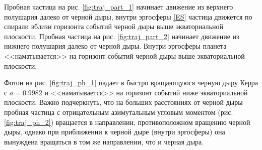 Пробная частица на рис. \cref{fig:traj_part_1} начинает движение из верхнего полушария далеко от черной дыры, внутри эргосферы \cref{ES} частица движется по спирали вблизи горизонта событий черной дыры выше экваториальной плоскости. Пробная частица на рис. \cref{fig:traj_part_2} начинает движение из нижнего полушария далеко от черной дыры. Внутри эргосферы планета <<наматывается>> на горизонт событий черной дыры выше экваториальной плоскости. 


Фотон на рис. \cref{fig:traj_ph_1} падает в быстро вращающуюся черную дыру Керра с \(a=0.9982\) и <<наматывается>> на горизонт событий ниже экваториальной плоскости. 
Важно подчеркнуть, что на больших расстояниях от черной дыры пробная частица с отрицательным азимутальным угловым моментом (рис. \cref{fig:traj_ph_2}) вращается в направлении, противоположном вращению черной дыры, однако при приближении к черной дыре (внутри эргосферы) она вынуждена вращаться в том же направлении, что и черная дыра.

